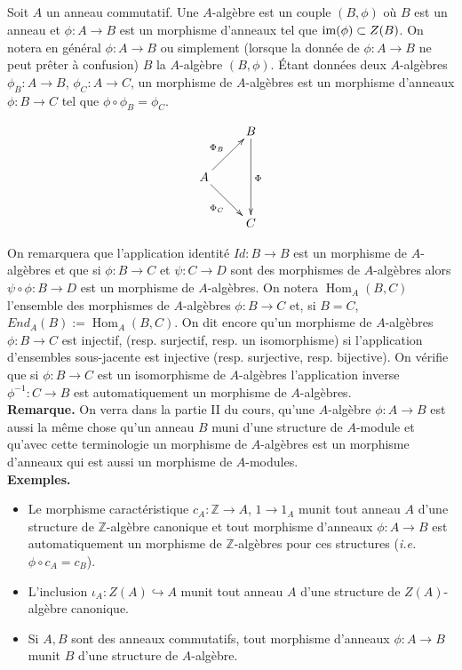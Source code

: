 \documentclass[a4paper, oneside, 12pt]{book}
\theoremstyle{theoremeStyle} %
\theoremstyle{definition} %
\newcommand{\ie}{\textit{i.e.}} %
\DeclareMathOperator{\SHom}{Hom}
\newcommand{\Z}{\mathbb{Z}}
\begin{document}
\subsection{}Soit $A$ un anneau commutatif. Une $A$-algèbre est un couple $(B,\phi)$ où $B$ est  un anneau et  $\phi:A\rightarrow B$ est un morphisme d'anneaux tel que $\hbox{\rm im}(\phi)\subset Z(B)$.   On notera en général $\phi:A\rightarrow B$ ou simplement  (lorsque la donnée de $\phi:A\rightarrow B$ ne peut prêter à confusion) $B$  la $A$-algèbre $(B,\phi)$.
Étant données deux $A$-algèbres $\phi_B:A\rightarrow B$, $\phi_C:A\rightarrow C$, un morphisme de $A$-algèbres est un morphisme d'anneaux $\phi:B\rightarrow C$ tel que $\phi\circ \phi_B=\phi_C$.

$$ \xymatrix{ & B \ar[dd]^\Phi \\ A \ar[ru]^{\Phi_B} \ar[rd]_{\Phi_C} \\ & C } $$

On remarquera que l'application identité $Id:B\rightarrow B$ est un morphisme de $A$-algèbres et que si $\phi:B\rightarrow C$ et $\psi:C\rightarrow D$ sont des morphismes de $A$-algèbres alors $\psi\circ \phi:B\rightarrow D$ est un morphisme de $A$-algèbres. On notera $\SHom_A(B,C)$ l'ensemble des morphismes de $A$-algèbres $\phi:B\rightarrow C$ et, si $B=C$, $End_A(B):=\SHom_A(B,C)$. On dit encore qu'un morphisme de $A$-algèbres $\phi:B\rightarrow C$ est injectif, (resp. surjectif, resp. un isomorphisme) si l'application d'ensembles sous-jacente est  injective (resp. surjective, resp. bijective). On vérifie que si $\phi:B\rightarrow C$ est un isomorphisme de $A$-algèbres l'application inverse $\phi^{-1}:C\rightarrow B$ est automatiquement un morphisme de $A$-algèbres.\\

 \textbf{Remarque.} On verra dans la partie II du cours, qu'une $A$-algèbre $\phi:A\rightarrow B$ est aussi la même chose qu'un anneau $B$ muni d'une structure de $A$-module  et qu'avec cette terminologie un morphisme de $A$-algèbres est un morphisme d'anneaux qui est aussi un morphisme de $A$-modules.  \\

\textbf{Exemples.}
\begin{itemize}[leftmargin=* ,parsep=0cm,itemsep=0cm,topsep=0cm]
\item Le morphisme caractéristique $c_A:\Z\rightarrow A$, $1\rightarrow 1_A$ munit tout anneau $A$ d'une structure de $\Z$-algèbre canonique et tout morphisme d'anneaux $\phi:A\rightarrow B$ est automatiquement un morphisme de $\Z$-algèbres pour ces structures (\ie{} $\phi\circ c_A=c_B$).
\item L'inclusion $\iota_A: Z(A)\hookrightarrow  A $  munit tout anneau $A$ d'une structure de $Z(A)$-algèbre canonique.
\item Si $A,B$ sont des anneaux commutatifs, tout morphisme d'anneaux $\phi:A\rightarrow B$ munit $B$ d'une structure de $A$-algèbre.\\
\end{itemize}
\end{document}
